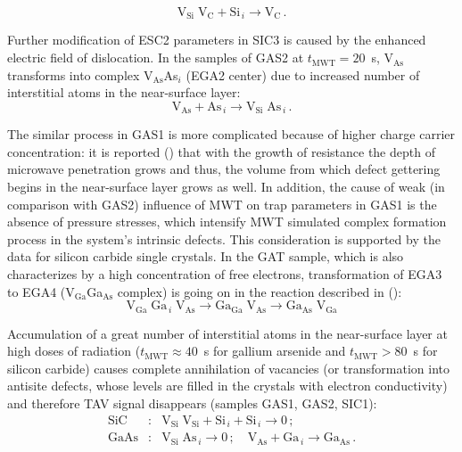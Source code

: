 \documentclass[final,3p,times,twocolumn,authoryear]{elsarticle}
\begin{document}
\begin{displaymath}
  \mathrm{V}_\mathrm{Si}\;\mathrm{V}_\mathrm{C}+\mathrm{Si}_{\,i} \rightarrow 
   \mathrm{V}_\mathrm{C}\,.
\end{displaymath}

Further modification of ESC2 parameters in SIC3 is caused by the enhanced electric field of dislocation.
In the samples of GAS2 at $t_\mathrm{MWT}=20$~s,
V$_\mathrm{As}$ transforms into complex V$_\mathrm{As}$As$_i$
(EGA2 center)
due to increased number of interstitial atoms in the near-surface layer:
\begin{displaymath}
\mathrm{V}_\mathrm{As}+ \mathrm{As}_{\,i} \rightarrow \mathrm{V}_\mathrm{Si}\;\mathrm{As}_{\,i}\,.
\end{displaymath}

The similar process in GAS1 is more complicated because of higher charge carrier concentration:
it is reported (\cite{ZOHM2000}) that with the growth of resistance the depth of microwave penetration grows
and thus, the volume from which defect gettering begins in the near-surface layer grows as well.
In addition, the cause of weak (in comparison with GAS2) influence of MWT on trap parameters in GAS1 is the absence of pressure stresses,
which intensify MWT simulated complex formation process in the system’s intrinsic defects.
This consideration is supported by the data for silicon carbide single crystals.
In the GAT sample, which is also characterizes by a high concentration of free electrons,
transformation of EGA3 to EGA4 (V$_\mathrm{Ga}$Ga$_\mathrm{As}$ complex) is going on in the reaction described in (\cite{FANG1990}):
\begin{displaymath}
  \mathrm{V}_\mathrm{Ga}\;\mathrm{Ga}_{\,i}\;\mathrm{V}_\mathrm{As}\rightarrow \mathrm{Ga}_\mathrm{Ga}\;\mathrm{V}_\mathrm{As}
  \rightarrow \mathrm{Ga}_\mathrm{As}\;\mathrm{V}_\mathrm{Ga}
\end{displaymath}


Accumulation of a great number of interstitial atoms in the near-surface layer at high doses of radiation
($t_\mathrm{MWT}\approx40$~s for gallium arsenide and $t_\mathrm{MWT}>80$~s for silicon carbide)
causes complete annihilation of vacancies (or transformation into antisite defects, whose levels are filled in the crystals with electron conductivity)
 and therefore TAV signal disappears (samples GAS1, GAS2, SIC1):
\begin{eqnarray}
  \nonumber
  \mathrm{SiC}&:&\mathrm{V}_\mathrm{Si}\;\mathrm{V}_\mathrm{Si}+\mathrm{Si}_{\,i}+ \mathrm{Si}_{\,i} \rightarrow 0\,;\\
  \nonumber
  \mathrm{GaAs}&:&\mathrm{V}_\mathrm{Si}\;\mathrm{As}_{\,i} \rightarrow 0\,;\quad
  \mathrm{V}_\mathrm{As}+\mathrm{Ga}_{\,i} \rightarrow \mathrm{Ga}_\mathrm{As}\,.
\end{eqnarray}
\end{document}
